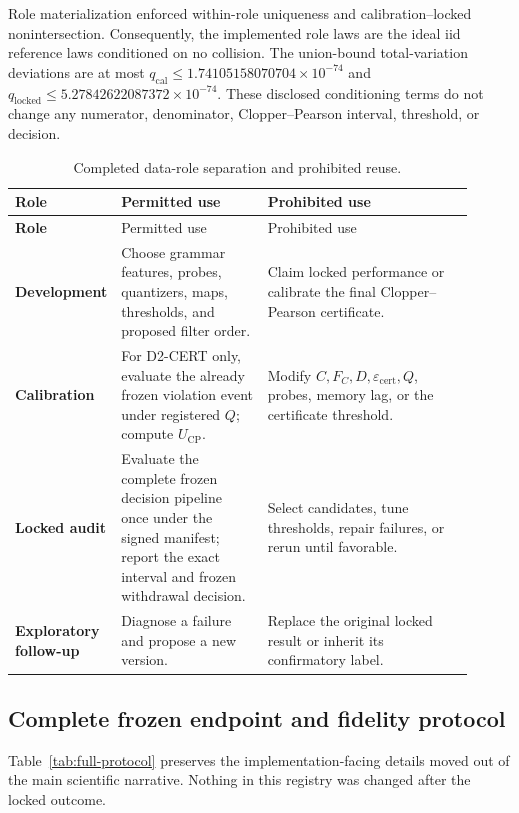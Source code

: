 Role materialization enforced within-role uniqueness and calibration--locked nonintersection.
Consequently, the implemented role laws are the ideal iid reference laws conditioned on no
collision. The union-bound
total-variation deviations are at most
\(q_{\mathrm{cal}}\le1.74105158070704\times10^{-74}\) and
\(q_{\mathrm{locked}}\le5.27842622087372\times10^{-74}\). These disclosed conditioning terms do
not change any numerator, denominator, Clopper--Pearson interval, threshold, or decision.

\begin{longtable}{>{\bfseries}p{0.14\linewidth}p{0.32\linewidth}p{0.45\linewidth}}
\caption{Completed data-role separation and prohibited reuse.}\label{tab:splits}\\
\toprule
Role & Permitted use & Prohibited use\\
\midrule
\endfirsthead
\toprule
Role & Permitted use & Prohibited use\\
\midrule
\endhead
Development & Choose grammar features, probes, quantizers, maps, thresholds, and proposed filter order. &
Claim locked performance or calibrate the final Clopper--Pearson certificate.\\
Calibration & For D2-CERT only, evaluate the already frozen violation event under registered \(Q\); compute
\(U_{\mathrm{CP}}\). &
Modify \(C,F_C,D,\varepsilon_{\mathrm{cert}},Q\), probes, memory lag, or the certificate threshold.\\
Locked audit & Evaluate the complete frozen decision pipeline once under the signed manifest;
report the exact interval and frozen withdrawal decision. &
Select candidates, tune thresholds, repair failures, or rerun until favorable.\\
Exploratory follow-up & Diagnose a failure and propose a new version. &
Replace the original locked result or inherit its confirmatory label.\\
\bottomrule
\end{longtable}

\subsection{Complete frozen endpoint and fidelity protocol}
\label{supp:protocol}

Table~\ref{tab:full-protocol} preserves the implementation-facing details moved out of the main
scientific narrative. Nothing in this registry was changed after the locked outcome.


